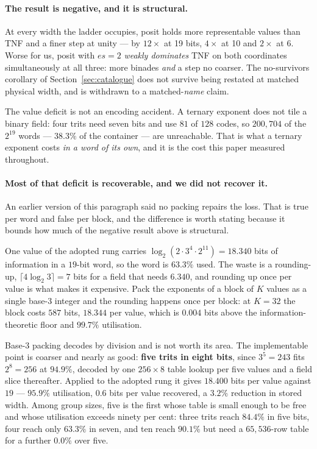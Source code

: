 \documentclass[11pt]{article}
\theoremstyle{definition}
\begin{document}
\paragraph{The result is negative, and it is structural.} At every width the
ladder occupies, posit holds more representable values than TNF and a finer step
at unity --- by $12\times$ at 19 bits, $4\times$ at 10 and $2\times$ at 6. Worse
for us, posit with $es{=}2$ \emph{weakly dominates} TNF on both coordinates
simultaneously at all three: more binades \emph{and} a step no coarser. The
no-survivors corollary of Section~\ref{sec:catalogue} does not survive being
restated at matched physical width, and is withdrawn to a matched-\emph{name}
claim.

The value deficit is not an encoding accident. A ternary exponent does not tile
a binary field: four trits need seven bits and use $81$ of $128$ codes, so
$200{,}704$ of the $2^{19}$ words --- $38.3\%$ of the container --- are
unreachable. That is what a ternary exponent costs \emph{in a word of its own},
and it is the cost this paper measured throughout.

\paragraph{Most of that deficit is recoverable, and we did not recover it.} An
earlier version of this paragraph said no packing repairs the loss. That is true
per word and false per block, and the difference is worth stating because it
bounds how much of the negative result above is structural.

One value of the adopted rung carries
$\log_2(2\cdot 3^4\cdot 2^{11}) = 18.340$ bits of information in a $19$-bit word,
so the word is $63.3\%$ used. The waste is a rounding-up, $\lceil 4\log_2
3\rceil = 7$ bits for a field that needs $6.340$, and rounding up once per value
is what makes it expensive. Pack the exponents of a block of $K$ values as a
single base-3 integer and the rounding happens once per block: at $K=32$ the
block costs $587$ bits, $18.344$ per value, which is $0.004$ bits above the
information-theoretic floor and $99.7\%$ utilisation.

Base-3 packing decodes by division and is not worth its area. The implementable
point is coarser and nearly as good: \textbf{five trits in eight bits}, since
$3^5=243$ fits $2^8=256$ at $94.9\%$, decoded by one $256\times8$ table lookup
per five values and a field slice thereafter. Applied to the adopted rung it
gives $18.400$ bits per value against $19$ --- $95.9\%$ utilisation, $0.6$ bits
per value recovered, a $3.2\%$ reduction in stored width. Among group sizes, five is the first whose table is small enough to be free and
whose utilisation exceeds ninety per cent: three trits reach $84.4\%$ in five
bits, four reach only $63.3\%$ in seven, and ten reach $90.1\%$ but need a
$65{,}536$-row table for a further $0.0\%$ over five.
\end{document}
